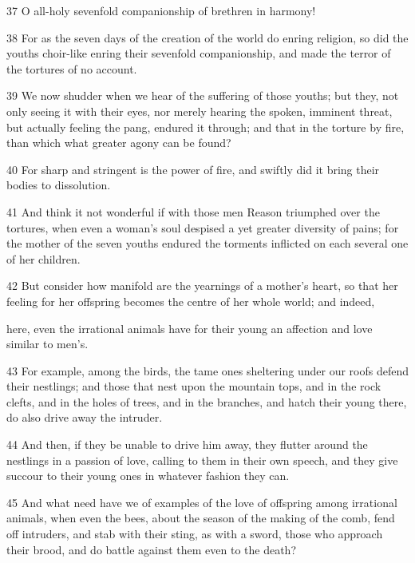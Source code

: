 \par 37 O all-holy sevenfold companionship of brethren in harmony!

\par 38 For as the seven days of the creation of the world do enring religion, so did the youths choir-like enring their sevenfold companionship, and made the terror of the tortures of no account.

\par 39 We now shudder when we hear of the suffering of those youths; but they, not only seeing it with their eyes, nor merely hearing the spoken, imminent threat, but actually feeling the pang, endured it through; and that in the torture by fire, than which what greater agony can be found?

\par 40 For sharp and stringent is the power of fire, and swiftly did it bring their bodies to dissolution.

\par 41 And think it not wonderful if with those men Reason triumphed over the tortures, when even a woman's soul despised a yet greater diversity of pains; for the mother of the seven youths endured the torments inflicted on each several one of her children.

\par 42 But consider how manifold are the yearnings of a mother's heart, so that her feeling for her offspring becomes the centre of her whole world; and indeed,

\par here, even the irrational animals have for their young an affection and love similar to men's.

\par 43 For example, among the birds, the tame ones sheltering under our roofs defend their nestlings; and those that nest upon the mountain tops, and in the rock clefts, and in the holes of trees, and in the branches, and hatch their young there, do also drive away the intruder.

\par 44 And then, if they be unable to drive him away, they flutter around the nestlings in a passion of love, calling to them in their own speech, and they give succour to their young ones in whatever fashion they can.

\par 45 And what need have we of examples of the love of offspring among irrational animals, when even the bees, about the season of the making of the comb, fend off intruders, and stab with their sting, as with a sword, those who approach their brood, and do battle against them even to the death?

